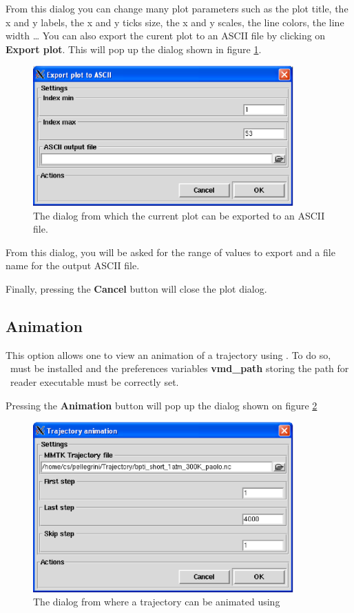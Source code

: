 \documentclass[a4paper,11pt]{report}
\begin{document}
\begin{itemize}
From this dialog you can change many plot parameters such as the plot title, the x and y labels, the x and y ticks size, 
the x and y scales, the line colors, the line width \ldots 
\newpage
You can also export the curent plot to an ASCII file by clicking on \textbf{Export plot}. This will pop up the dialog shown in figure 
\ref{fig:export_plot}.
\begin{figure}[h!]
\begin{center}
\includegraphics[width=10cm]{Figures/export_plot.eps}
\end{center}
\caption[The export plot dialog]{The dialog from which the current plot can be exported to an ASCII file.}
\label{fig:export_plot}
\end{figure}   

From this dialog, you will be asked for the range of values to export and a file name for the output ASCII file.

Finally, pressing the \textbf{Cancel} button will close the plot dialog.

\end{itemize}

\subsection{Animation}
\label{animation}
This option allows one to view an animation of a trajectory using \VMD . To do so, \VMD\ must be installed and the  
preferences variables \textbf{vmd\_path} storing the path for \VMD\ reader executable must be correctly set. 

Pressing the \textbf{Animation} button will pop up the dialog shown on figure \ref{fig:animation}
\begin{figure}[h!]
\begin{center}
\includegraphics[width=10cm]{Figures/animation.eps}
\end{center}
\caption[The trajectory animation  dialog]{The dialog from where a trajectory can be animated using \VMD }
\label{fig:animation}
\end{figure}   
\end{document}

